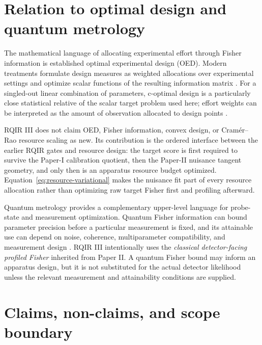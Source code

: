 \section{Relation to optimal design and quantum metrology}
\label{sec:relations}

The mathematical language of allocating experimental effort through Fisher information is established optimal experimental design (OED). Modern treatments formulate design measures as weighted allocations over experimental settings and optimize scalar functions of the resulting information matrix \cite{Huan2024}. For a singled-out linear combination of parameters, c-optimal design is a particularly close statistical relative of the scalar target problem used here; effort weights can be interpreted as the amount of observation allocated to design points \cite{WatsonPan2023}.

RQIR III does not claim OED, Fisher information, convex design, or Cram\'er--Rao resource scaling as new. Its contribution is the ordered interface between the earlier RQIR gates and resource design: the target score is first required to survive the Paper-I calibration quotient, then the Paper-II nuisance tangent geometry, and only then is an apparatus resource budget optimized. Equation~\eqref{eq:resource-variational} makes the nuisance fit part of every resource allocation rather than optimizing raw target Fisher first and profiling afterward.

Quantum metrology provides a complementary upper-level language for probe-state and measurement optimization. Quantum Fisher information can bound parameter precision before a particular measurement is fixed, and its attainable use can depend on noise, coherence, multiparameter compatibility, and measurement design \cite{Giovannetti2011,Pezze2018,Liu2020}. RQIR III intentionally uses the \emph{classical detector-facing profiled Fisher} inherited from Paper II. A quantum Fisher bound may inform an apparatus design, but it is not substituted for the actual detector likelihood unless the relevant measurement and attainability conditions are supplied.

\section{Claims, non-claims, and scope boundary}
\label{sec:scope}


